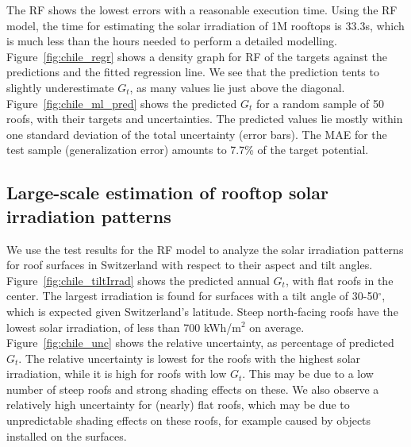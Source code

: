 The RF shows the lowest errors with a reasonable execution time. 
Using the RF model, the time for estimating the solar irradiation of 1M rooftops is 33.3s, which is much less than the hours needed to perform a detailed modelling. Figure~\ref{fig:chile_regr} shows a density graph for RF of the targets against the predictions and the fitted regression line. We see that the prediction tents to slightly underestimate $G_t$, as many values lie just above the diagonal. Figure~\ref{fig:chile_ml_pred} shows the predicted $G_t$ for a random sample of 50 roofs, with their targets and uncertainties. The predicted values lie mostly within one standard deviation of the total uncertainty (error bars). The MAE for the test sample (generalization error) amounts to 7.7\% of the target potential. %

\subsection{Large-scale estimation of rooftop solar irradiation patterns}
\label{chile_predict}

We use the test results for the RF model to analyze the solar irradiation patterns for roof surfaces in Switzerland with respect to their aspect and tilt angles. Figure~\ref{fig:chile_tiltIrrad} shows the predicted annual $G_t$, with flat roofs in the center. The largest irradiation is found for surfaces with a tilt angle of 30-50$^\circ$, which is expected given Switzerland’s latitude. Steep north-facing roofs have the lowest solar irradiation, of less than 700 kWh/m$^2$ on average. Figure~\ref{fig:chile_unc} shows the relative uncertainty, as percentage of predicted $G_t$. The relative uncertainty is lowest for the roofs with the highest solar irradiation, while it is high for roofs with low $G_t$. This may be due to a low number of steep roofs and strong shading effects on these. We also observe a relatively high uncertainty for (nearly) flat roofs, which may be due to unpredictable shading effects on these roofs, for example caused by objects installed on the surfaces.

